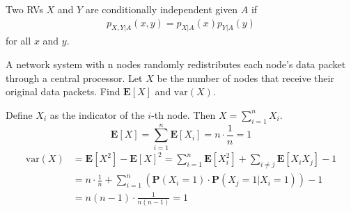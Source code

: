 \begin{definition}
    Two RVs $X$ and $Y$ are conditionally independent given $A$ if
    \begin{align}
        p_{X, Y|A}(x, y) = p_{X|A}(x) p_{Y|A}(y)
    \end{align}
    for all $x$ and $y$.
\end{definition}
\begin{example}
    A network system with n nodes randomly redistributes each node's data packet through a central processor. Let $X$ be the number of nodes that receive their original data packets. Find $\mathbf{E}[X]$ and $\text{var}(X)$. 
    \begin{solution}
        Define $X_i$ as the indicator of the $i$-th node. Then $X = \sum_{i=1}^n X_i$. 
        \begin{equation}
            \mathbf{E}[X] = \sum_{i=1}^{n} \mathbf{E}[X_i] = n \cdot \frac{1}{n} = 1
        \end{equation}
        \begin{equation}
        \begin{aligned}
            \text{var}(X) &= \mathbf{E}[X^2] - \mathbf{E}[X]^2 = \sum_{i=1}^{n} \mathbf{E}[X_i^2] + \sum_{i \neq j} \mathbf{E}[X_i X_j] - 1 \\ 
            &= n \cdot \frac{1}{n} + \sum_{i=1}^{n} \left(\mathbf{P}(X_i = 1) \cdot \mathbf{P}(X_j = 1 | X_i = 1)\right) - 1 \\ 
            &= n(n-1) \cdot \frac{1}{n(n-1)} = 1
        \end{aligned}
        \end{equation}
    \end{solution}
\end{example}
